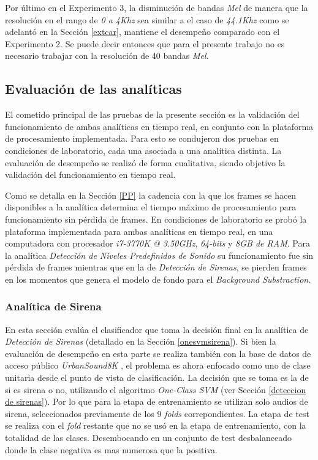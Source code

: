 \documentclass{article}
\begin{document}
\bigskip
Por último en el Experimento 3, la disminución de bandas \textit{Mel} de manera que la resolución en el rango de \textit{0 a 4Khz} sea similar a el caso de \textit{44.1Khz} como se adelantó en la Sección \ref{extcar}, mantiene el desempeño comparado con el Experimento 2. Se puede decir entonces que para el presente trabajo no es necesario trabajar con la resolución de 40 bandas \textit{Mel}. 

\subsection{Evaluación de las analíticas}

El cometido principal de las pruebas de la presente sección es la validación del funcionamiento de ambas analíticas en tiempo real, en conjunto con la plataforma de procesamiento implementada. Para esto se condujeron dos pruebas en condiciones de laboratorio, cada una asociada a una analítica distinta. La evaluación de desempeño se realizó de forma cualitativa, siendo objetivo la validación del funcionamiento en tiempo real. 

\bigskip
Como se detalla en la Sección \ref{PP} la cadencia con la que los frames se hacen disponibles a la analítica determina el tiempo máximo de procesamiento para funcionamiento sin pérdida de frames. En condiciones de laboratorio se probó la plataforma implementada para ambas analíticas en tiempo real, en una computadora con procesador \textit{i7-3770K @ 3.50GHz}, \textit{64-bits} y \textit{8GB de RAM}. Para la analítica \textit{Detección de Niveles Predefinidos de Sonido} su funcionamiento fue sin pérdida de frames mientras que en la de \textit{Detección de Sirenas}, se pierden frames en los momentos que genera el modelo de fondo para el \textit{Background Substraction}.       

   
\subsubsection{Analítica de Sirena}

En esta sección evalúa el clasificador que toma la decisión final en la analítica de \textit{Detección de Sirenas} (detallado en la Sección \ref{onesvmsirena}). Si bien la evaluación de desempeño en esta parte se realiza también con la base de datos de acceso público \textit{UrbanSound8K} \citep{Salamon:UrbanSound:ACMMM:14}, el problema es ahora enfocado como uno de clase unitaria desde el punto de vista de clasificación. La decisión que se toma es la de si es sirena o no, utilizando el algoritmo \textit{One-Class SVM} (ver Sección \ref{deteccion de sirenas}). Por lo que para la etapa de entrenamiento se utilizan solo audios de sirena, seleccionados previamente de los 9 \textit{folds} correpondientes. La etapa de test se realiza con el \textit{fold} restante que no se usó en la etapa de entrenamiento, con la totalidad de las clases. Desembocando en un conjunto de test desbalanceado donde la clase negativa es mas numerosa que la positiva.
\end{document}
